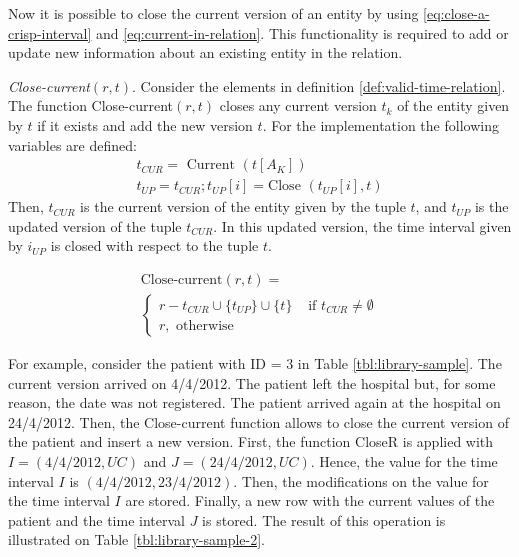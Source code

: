 Now it is possible to close the current version of an entity by using \eqref{eq:close-a-crisp-interval} and \eqref{eq:current-in-relation}. This functionality is required to add or update new information about an existing entity in the relation.

\begin{definition}
\label{def:close-current-version}
\emph{Close-current$\left(r, t\right)$}.
Consider the elements in definition \ref{def:valid-time-relation}. The function Close-current$\left(r, t \right)$ closes any current version $t_k$ of the entity given by $t$ if it exists and add the new version $t$. For the implementation the following variables are defined:
\begin{align}
 \label{eq:variables-current-version}
t_{CUR} = \mbox{ Current } \left(t[A_K] \right)\\
\nonumber
t_{UP} = t_{CUR}; t_{UP}\left[i \right] = \mbox{Close }\left(t_{UP}\left[i \right], t \right)
\nonumber
\end{align}
Then, $t_{CUR}$ is the current version of the entity given by the tuple $t$, and $t_{UP}$ is the updated version of the tuple $t_{CUR}$. In this updated version, the time interval given by $i_{UP}$ is closed with respect to the tuple $t$.


\begin{eqnarray}
\label{eq:close-current}
\text{Close-current} \left(r, t \right) =\\
\begin{cases}
\nonumber
r - t_{CUR} \cup \lbrace t_{UP}\rbrace \cup \lbrace t \rbrace
& \mbox{ if } t_{CUR} \neq \emptyset \\
\nonumber r , \text{ otherwise}
\end{cases}
\end{eqnarray}
\end{definition}

For example, consider the patient with ID = 3 in Table \ref{tbl:library-sample}. The current version arrived on 4/4/2012. The patient left the hospital but, for some reason, the date  was not registered. The patient arrived again at the hospital on 24/4/2012. Then, the Close-current function allows to close the current version of the patient and insert a new version. First, the function CloseR is applied with $I = \left(4/4/2012, UC \right)$ and $J = \left(24/4/2012, UC \right)$. Hence, the value for the time interval $I$ is $ \left(4/4/2012, 23/4/2012 \right)$. Then, the modifications on the value for the time interval $I$ are stored. Finally, a new row with the current values of the patient and the time interval $J$ is stored.
The result of this operation is illustrated on Table \ref{tbl:library-sample-2}.




